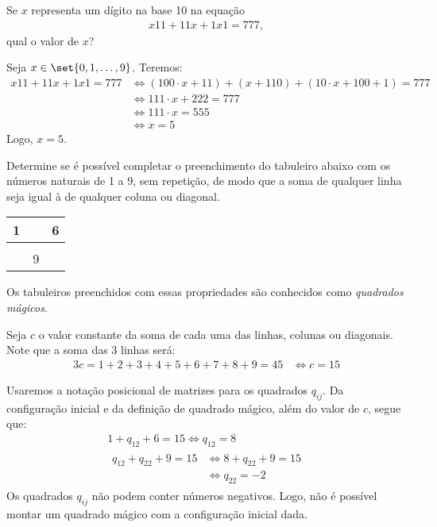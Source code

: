 \begin{example}
Se $x$ representa um dígito na base 10 na equação
%
\begin{align*}
x11 + 11x + 1x1 =777,
\end{align*}
%
 qual o valor de $x$?
\end{example}

\begin{solution}
Seja $x \in \set{0,1,\ldots, 9}$. Teremos:
%
\begin{align*}
x11 + 11x + 1x1 =777 & \iff \left(100\cdot x + 11 \right) + \left(x + 110 \right) + \left(10 \cdot x + 100 + 1 \right) = 777 \\
	& \iff 111\cdot x+222 = 777 \\
	& \iff 111\cdot x = 555 \\
	& \iff x=5 
\end{align*}
%
Logo, $x=5$.
\end{solution}

\begin{example}
\label{ex:quadrado-magico-3x3}
Determine se é possível completar o preenchimento do tabuleiro abaixo com os números naturais de 1 a 9, sem repetição, de modo que a soma de qualquer linha seja igual à de qualquer coluna ou diagonal.

\begin{center}
\begin{tabular}{|c|c|c|}
	\hline
	1 &   & 6 \\ \hline
		&   &   \\ \hline
		& 9 &   \\
	\hline
\end{tabular}
\end{center}
Os tabuleiros preenchidos com essas propriedades são conhecidos como \emph{quadrados mágicos}.
\end{example}

\begin{solution}
Seja $c$ o valor constante da soma de cada uma das linhas, colunas ou diagonais. Note que a soma das 3 linhas será:
%
\begin{align*}
3c = 1+2+3+4+5+6+7+8+9=45 & \iff c =15
\end{align*}

Usaremos a notação posicional de matrizes para os quadrados $q_{ij}$. Da configuração inicial e da definição de quadrado mágico, além do valor de $c$, segue que:
%
\begin{gather*}
		1+q_{12}+6=15  \iff q_{12} = 8 \\
		\begin{aligned}
						q_{12} + q_{22} + 9= 15 & \iff 8+q_{22} + 9= 15\\
						& \iff q_{22} = -2
		\end{aligned}
\end{gather*}
%
\noindent Os quadrados $q_{ij}$ não podem conter números negativos. Logo, não é possível montar um quadrado mágico com a configuração inicial dada.
\end{solution}

